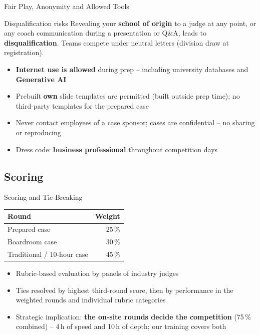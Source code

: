 \documentclass[aspectratio=169,11pt]{beamer}
\begin{document}
\begin{frame}{Fair Play, Anonymity and Allowed Tools}
  \begin{alertblock}{Disqualification risks}
    Revealing your \textbf{school of origin} to a judge at any point, or any coach communication during a presentation or Q\&A, leads to \textbf{disqualification}. Teams compete under neutral letters (division draw at registration).
  \end{alertblock}
  \begin{itemize}
    \item \textbf{Internet use is allowed} during prep -- including university databases and \textbf{Generative AI}
    \item Prebuilt \textbf{own} slide templates are permitted (built outside prep time); no third-party templates for the prepared case
    \item Never contact employees of a case sponsor; cases are confidential -- no sharing or reproducing
    \item Dress code: \textbf{business professional} throughout competition days
  \end{itemize}
\end{frame}

\subsection{Scoring}

\begin{frame}{Scoring and Tie-Breaking}
  \begin{center}
    \begin{tabular}{lr}
      \toprule
      \textbf{Round} & \textbf{Weight} \\
      \midrule
      Prepared case    & 25\,\% \\
      Boardroom case   & 30\,\% \\
      Traditional / 10-hour case & 45\,\% \\
      \bottomrule
    \end{tabular}
  \end{center}
  \begin{itemize}
    \item Rubric-based evaluation by panels of industry judges
    \item Ties resolved by highest third-round score, then by performance in the weighted rounds and individual rubric categories
    \item Strategic implication: \textbf{the on-site rounds decide the competition} (75\,\% combined) -- 4\,h of speed and 10\,h of depth; our training covers both
  \end{itemize}
\end{frame}
\end{document}
